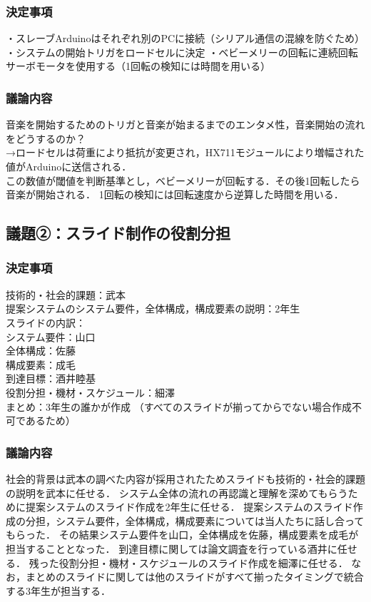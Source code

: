 \documentclass[a4paper,12pt]{ltjsarticle}
\begin{document}
\subsubsection*{決定事項}
・スレーブArduinoはそれぞれ別のPCに接続（シリアル通信の混線を防ぐため）
・システムの開始トリガをロードセルに決定
・ベビーメリーの回転に連続回転サーボモータを使用する（1回転の検知には時間を用いる）
\subsubsection*{議論内容}
音楽を開始するためのトリガと音楽が始まるまでのエンタメ性，音楽開始の流れをどうするのか？ \\
→ロードセルは荷重により抵抗が変更され，HX711モジュールにより増幅された値がArduinoに送信される． \\
この数値が閾値を判断基準とし，ベビーメリーが回転する．その後1回転したら音楽が開始される．
1回転の検知には回転速度から逆算した時間を用いる．

\subsection*{議題②：スライド制作の役割分担}

\subsubsection*{決定事項}
技術的・社会的課題：武本\\
提案システムのシステム要件，全体構成，構成要素の説明：2年生\\
スライドの内訳：\\
  システム要件：山口\\
  全体構成：佐藤\\
  構成要素：成毛\\
到達目標：酒井睦基\\
役割分担・機材・スケジュール：細澤\\
まとめ：3年生の誰かが作成
（すべてのスライドが揃ってからでない場合作成不可であるため）
\subsubsection*{議論内容}
社会的背景は武本の調べた内容が採用されたためスライドも技術的・社会的課題の説明を武本に任せる．
システム全体の流れの再認識と理解を深めてもらうために提案システムのスライド作成を2年生に任せる．
提案システムのスライド作成の分担，システム要件，全体構成，構成要素については当人たちに話し合ってもらった．
その結果システム要件を山口，全体構成を佐藤，構成要素を成毛が担当することとなった．
到達目標に関しては論文調査を行っている酒井に任せる．
残った役割分担・機材・スケジュールのスライド作成を細澤に任せる．
なお，まとめのスライドに関しては他のスライドがすべて揃ったタイミングで統合する3年生が担当する．
\end{document}
